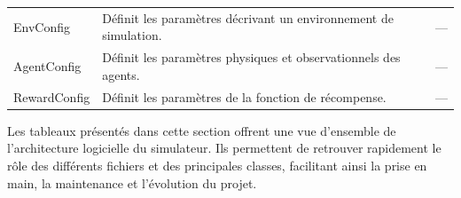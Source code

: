 \begin{longtable}{
        >{\ttfamily\small}p{}
        p{}
        >{\ttfamily\small}p{}
    }
    EnvConfig
                                 & Définit les paramètres décrivant un environnement de simulation.                                                                                                               & ---
    \\

    AgentConfig
                                 & Définit les paramètres physiques et observationnels des agents.                                                                                                                & ---
    \\

    RewardConfig
                                 & Définit les paramètres de la fonction de récompense.                                                                                                                           & ---
    \\
\end{longtable}

\noindent Les tableaux présentés dans cette section offrent une vue d'ensemble de l'architecture logicielle du simulateur. Ils permettent de retrouver rapidement le rôle des différents fichiers et des principales classes, facilitant ainsi la prise en main, la maintenance et l'évolution du projet.
